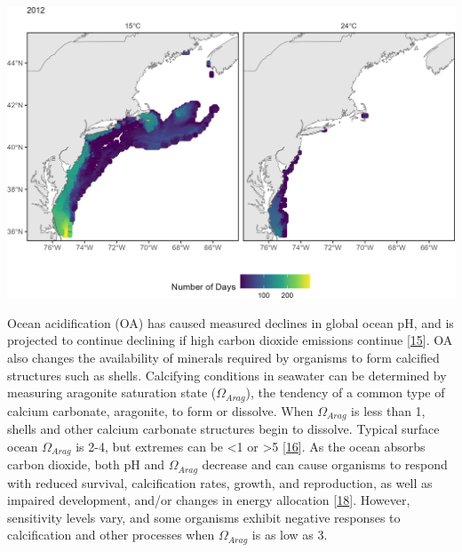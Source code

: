 \documentclass[
  10pt,
]{article}
\begin{document}
\begin{center}\includegraphics{SOE-NEFMC_files/figure-latex/therm-hab-persist-2012-1} \end{center}

Ocean acidification (OA) has caused measured declines in global ocean pH, and is projected to continue declining if high carbon dioxide emissions continue {[}\protect\hyperlink{ref-intergovernmental_panel_on_climate_change_ipcc_technical_2022}{15}{]}. OA also changes the availability of minerals required by organisms to form calcified structures such as shells. Calcifying conditions in seawater can be determined by measuring aragonite saturation state (\(\Omega_{Arag}\)), the tendency of a common type of calcium carbonate, aragonite, to form or dissolve. When \(\Omega_{Arag}\) is less than 1, shells and other calcium carbonate structures begin to dissolve. Typical surface ocean \(\Omega_{Arag}\) is 2-4, but extremes can be \textless1 or \textgreater5 {[}\protect\hyperlink{ref-jiang_climatological_2015}{16}{]}. As the ocean absorbs carbon dioxide, both pH and \(\Omega_{Arag}\) decrease and can cause organisms to respond with reduced survival, calcification rates, growth, and reproduction, as well as impaired development, and/or changes in energy allocation {[}\protect\hyperlink{ref-saba_recommended_2019}{18}{]}. However, sensitivity levels vary, and some organisms exhibit negative responses to calcification and other processes when \(\Omega_{Arag}\) is as low as 3.
\end{document}
